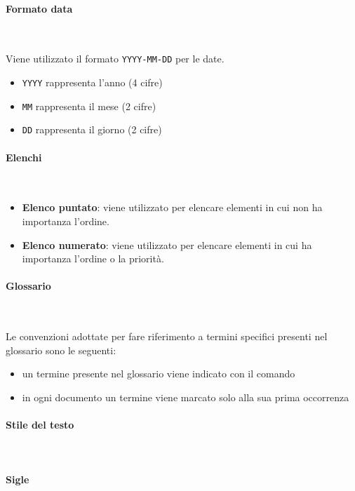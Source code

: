         \paragraph{Formato data} ~

         Viene utilizzato il formato \texttt{YYYY-MM-DD} per le date.
            \begin{itemize}
                \item \texttt{YYYY} rappresenta l'anno (4 cifre)
                \item \texttt{MM} rappresenta il mese (2 cifre)
                \item \texttt{DD} rappresenta il giorno (2 cifre)
            \end{itemize}

        \paragraph{Elenchi} ~

        \begin{itemize}
            \item \textbf{Elenco puntato}: viene utilizzato per elencare elementi in cui non ha importanza l'ordine.
            \item \textbf{Elenco numerato}: viene utilizzato per elencare elementi in cui ha importanza l'ordine o la priorità.
        \end{itemize}

        \paragraph{Glossario} ~

         Le convenzioni adottate per fare riferimento a termini specifici presenti nel glossario sono le seguenti:
            \begin{itemize}
                \item un termine presente nel glossario viene indicato con il comando \glo
                \item in ogni documento un termine viene marcato solo alla sua prima occorrenza
            \end{itemize}

        \paragraph{Stile del testo} ~

        \paragraph{Sigle} ~

